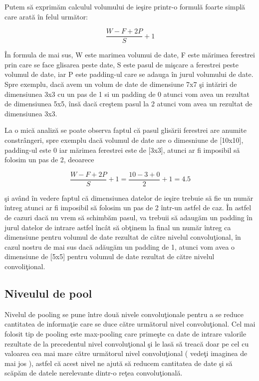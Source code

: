 Putem s\u{a} exprim\u{a}m calculul volumului de ie\c{s}ire printr-o formul\u{a} foarte simpl\u{a} care arat\u{a} \^{i}n felul urm\u{a}tor:

$$ \frac{W - F + 2P }{S} + 1 $$

\^{I}n formula de mai sus, W este marimea volumui de date, F este m\u{a}rimea ferestrei prin care se face glisarea peste date, S este pasul de mi\c{s}care a ferestrei peste volumul de date, iar P este padding-ul care se adauga \^{i}n jurul volumului de date. Spre exemplu, dac\u{a} avem un volum de date de dimensiune 7x7 \c{s}i int\u{a}riri de dimensiunea 3x3 cu un pas de 1 si un padding de 0 atunci vom avea un rezultat de dimensiunea 5x5, \^{i}ns\u{a} dac\u{a} cre\c{s}tem pasul la 2 atunci vom avea un rezultat de dimensiunea 3x3.

\par

La o mic\u{a} analiz\u{a} se poate observa faptul c\u{a} pasul glis\u{a}rii ferestrei are anumite constr\^{a}ngeri, spre exemplu dac\u{a} volumul de date are o dimesniune de [10x10], padding-ul este 0 iar m\u{a}rimea ferestrei este de [3x3], atunci ar fi imposibil s\u{a} folosim un pas de 2, deoarece

$$ \frac{W - F + 2P }{S} + 1 = \frac{10 - 3 + 0 }{2} + 1 = 4.5 $$

\c{s}i av\^{a}nd \^{i}n vedere faptul c\u{a} dimensiunea datelor de ie\c{s}ire trebuie s\u{a} fie un num\u{a}r \^{i}ntreg atunci ar fi imposibil s\u{a} folosim un pas de 2 \^{i}ntr-un astfel de caz. \^{I}n astfel de cazuri dac\u{a} nu vrem s\u{a} schimb\u{a}m pasul, va trebuii s\u{a} adaug\u{a}m un padding \^{i}n jurul datelor de intrare astfel \^{i}nc\^{a}t s\u{a} ob\c{t}inem la final un num\u{a}r \^{i}ntreg ca dimensiune pentru volumul de date rezultat de c\u{a}tre nivelul convolu\c{t}ional, \^{i}n cazul nostru de mai sus dac\u{a} ad\u{a}ug\u{a}m un padding de 1, atunci vom avea  o dimensiune de [5x5] pentru volumul de date rezultat de c\u{a}tre nivelul convoli\c{t}ional.

\subsection{Niveulul de pool}

Nivelul de pooling se pune \^{i}ntre dou\u{a} nivele convolu\c{t}ionale pentru a se reduce cantitatea de informa\c{t}ie care se duce c\u{a}tre urm\u{a}torul nivel convolu\c{t}ional. Cel mai folosit tip de pooling este max-pooling care prime\c{s}te ca date de intrare valorile rezultate de la precedentul nivel convolu\c{t}ional \c{s}i le las\u{a} s\u{a} treac\u{a} doar pe cel cu valoarea cea mai mare c\u{a}tre urm\u{a}torul nivel convolu\c{t}ional ( vede\c{t}i imaginea de mai jos ), astfel c\u{a} acest nivel ne ajut\u{a} s\u{a} reducem cantitatea de date \c{s}i s\u{a} sc\u{a}p\u{a}m de datele nerelevante dintr-o re\c{t}ea convolu\c{t}ional\u{a}. 

